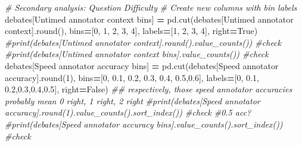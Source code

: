 \documentclass[
]{article}
\newenvironment{Shaded}{\begin{snugshade}}{\end{snugshade}}
\newcommand{\BuiltInTok}[1]{#1}
\newcommand{\CommentTok}[1]{\textcolor[rgb]{0.56,0.35,0.01}{\textit{#1}}}
\newcommand{\DecValTok}[1]{\textcolor[rgb]{0.00,0.00,0.81}{#1}}
\newcommand{\FloatTok}[1]{\textcolor[rgb]{0.00,0.00,0.81}{#1}}
\newcommand{\NormalTok}[1]{#1}
\newcommand{\OperatorTok}[1]{\textcolor[rgb]{0.81,0.36,0.00}{\textbf{#1}}}
\newcommand{\StringTok}[1]{\textcolor[rgb]{0.31,0.60,0.02}{#1}}
\newcommand{\VariableTok}[1]{\textcolor[rgb]{0.00,0.00,0.00}{#1}}
\begin{document}
\begin{Shaded}
\begin{Highlighting}[]
\CommentTok{\# Secondary analysis: Question Difficulty}
\CommentTok{\# Create new columns with bin labels}
\NormalTok{debates[}\StringTok{\textquotesingle{}Untimed annotator context bins\textquotesingle{}}\NormalTok{] }\OperatorTok{=}\NormalTok{ pd.cut(debates[}\StringTok{\textquotesingle{}Untimed annotator context\textquotesingle{}}\NormalTok{].}\BuiltInTok{round}\NormalTok{(), bins}\OperatorTok{=}\NormalTok{[}\DecValTok{0}\NormalTok{, }\DecValTok{1}\NormalTok{, }\DecValTok{2}\NormalTok{, }\DecValTok{3}\NormalTok{, }\DecValTok{4}\NormalTok{], labels}\OperatorTok{=}\NormalTok{[}\StringTok{\textquotesingle{}1\textquotesingle{}}\NormalTok{, }\StringTok{\textquotesingle{}2\textquotesingle{}}\NormalTok{, }\StringTok{\textquotesingle{}3\textquotesingle{}}\NormalTok{, }\StringTok{\textquotesingle{}4\textquotesingle{}}\NormalTok{], right}\OperatorTok{=}\VariableTok{True}\NormalTok{)}
\CommentTok{\#print(debates[\textquotesingle{}Untimed annotator context\textquotesingle{}].round().value\_counts()) \#check}
\CommentTok{\#print(debates[\textquotesingle{}Untimed annotator context bins\textquotesingle{}].value\_counts()) \#check}
\NormalTok{debates[}\StringTok{\textquotesingle{}Speed annotator accuracy bins\textquotesingle{}}\NormalTok{] }\OperatorTok{=}\NormalTok{ pd.cut(debates[}\StringTok{\textquotesingle{}Speed annotator accuracy\textquotesingle{}}\NormalTok{].}\BuiltInTok{round}\NormalTok{(}\DecValTok{1}\NormalTok{), bins}\OperatorTok{=}\NormalTok{[}\DecValTok{0}\NormalTok{, }\FloatTok{0.1}\NormalTok{, }\FloatTok{0.2}\NormalTok{, }\FloatTok{0.3}\NormalTok{, }\FloatTok{0.4}\NormalTok{, }\FloatTok{0.5}\NormalTok{,}\FloatTok{0.6}\NormalTok{], labels}\OperatorTok{=}\NormalTok{[}\StringTok{\textquotesingle{}0\textquotesingle{}}\NormalTok{, }\StringTok{\textquotesingle{}0.1\textquotesingle{}}\NormalTok{, }\StringTok{\textquotesingle{}0.2\textquotesingle{}}\NormalTok{,}\StringTok{\textquotesingle{}0.3\textquotesingle{}}\NormalTok{,}\StringTok{\textquotesingle{}0.4\textquotesingle{}}\NormalTok{,}\StringTok{\textquotesingle{}0.5\textquotesingle{}}\NormalTok{], right}\OperatorTok{=}\VariableTok{False}\NormalTok{)}
\CommentTok{\#\# respectively, those speed annotator accuracies probably mean 0 right, 1 right, 2 right}
\CommentTok{\#print(debates[\textquotesingle{}Speed annotator accuracy\textquotesingle{}].round(1).value\_counts().sort\_index()) \#check \#0.5 acc? }
\CommentTok{\#print(debates[\textquotesingle{}Speed annotator accuracy bins\textquotesingle{}].value\_counts().sort\_index()) \#check}


\end{Highlighting}
\end{Shaded}
\end{document}
